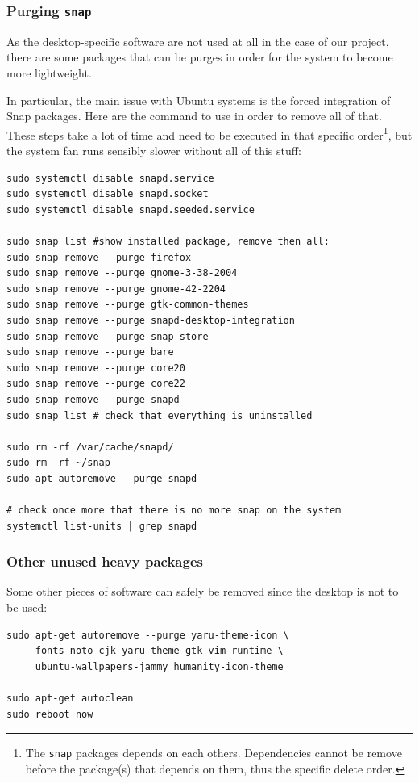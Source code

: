 \documentclass[10pt]{article}
\begin{document}
\subsubsection{Purging \texttt{snap}}
\label{sec:org881e419}
As the desktop-specific software are not used at all in the case
of our project, there are some packages that can be purges in order for the
system to become more lightweight.

In particular, the main issue with Ubuntu systems is the forced integration of
Snap packages. Here are the command to use in order to remove all of that.
These steps take a lot of time and need to be executed in that specific order\footnote{The \texttt{snap} packages depends on each others. Dependencies
cannot be remove before the package(s) that depends on them,
thus the specific delete order.},
but the system fan runs sensibly slower without all of this stuff:

\begin{verbatim}
sudo systemctl disable snapd.service
sudo systemctl disable snapd.socket
sudo systemctl disable snapd.seeded.service

sudo snap list #show installed package, remove then all:
sudo snap remove --purge firefox
sudo snap remove --purge gnome-3-38-2004
sudo snap remove --purge gnome-42-2204
sudo snap remove --purge gtk-common-themes
sudo snap remove --purge snapd-desktop-integration
sudo snap remove --purge snap-store
sudo snap remove --purge bare
sudo snap remove --purge core20
sudo snap remove --purge core22
sudo snap remove --purge snapd
sudo snap list # check that everything is uninstalled

sudo rm -rf /var/cache/snapd/
sudo rm -rf ~/snap
sudo apt autoremove --purge snapd

# check once more that there is no more snap on the system
systemctl list-units | grep snapd 
\end{verbatim}

\subsubsection{Other unused heavy packages}
\label{sec:org65f0eea}
Some other pieces of software can safely be removed since the desktop is
not to be used:

\begin{verbatim}
sudo apt-get autoremove --purge yaru-theme-icon \
     fonts-noto-cjk yaru-theme-gtk vim-runtime \
     ubuntu-wallpapers-jammy humanity-icon-theme

sudo apt-get autoclean
sudo reboot now
\end{verbatim}
\end{document}

